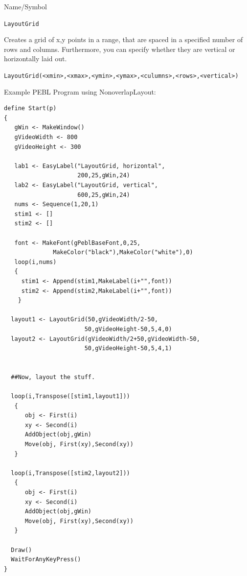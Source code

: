 \begin{desc}{Name/Symbol}
   
\item[Name/Symbol] \verb+LayoutGrid+

\item[Description]      Creates a grid of x,y points in a range, that are 
spaced in a specified number of rows and columns.  Furthermore, you can specify
whether they are vertical or horizontally laid out.

\item[Usage]       
\verb+LayoutGrid(<xmin>,<xmax>,<ymin>,<ymax>,<culumns>,<rows>,<vertical>)+

\item[Example]

Example PEBL Program using NonoverlapLayout:
\begin{verbatim}
define Start(p)
{
   gWin <- MakeWindow()
   gVideoWidth <- 800
   gVideoHeight <- 300

   lab1 <- EasyLabel("LayoutGrid, horizontal",
                     200,25,gWin,24)
   lab2 <- EasyLabel("LayoutGrid, vertical",
                     600,25,gWin,24)
   nums <- Sequence(1,20,1)
   stim1 <- []
   stim2 <- []

   font <- MakeFont(gPeblBaseFont,0,25,
              MakeColor("black"),MakeColor("white"),0)
   loop(i,nums)
   {
     stim1 <- Append(stim1,MakeLabel(i+"",font))
     stim2 <- Append(stim2,MakeLabel(i+"",font))
    }

  layout1 <- LayoutGrid(50,gVideoWidth/2-50,
                       50,gVideoHeight-50,5,4,0)
  layout2 <- LayoutGrid(gVideoWidth/2+50,gVideoWidth-50,
                       50,gVideoHeight-50,5,4,1)


  ##Now, layout the stuff.

  loop(i,Transpose([stim1,layout1]))
   {	
      obj <- First(i)
      xy <- Second(i)
      AddObject(obj,gWin)
      Move(obj, First(xy),Second(xy))
   }

  loop(i,Transpose([stim2,layout2]))
   {	
      obj <- First(i)
      xy <- Second(i)
      AddObject(obj,gWin)
      Move(obj, First(xy),Second(xy))
   }

  Draw()
  WaitForAnyKeyPress()
}
\end{verbatim}


\end{desc}
